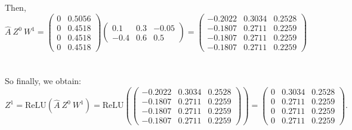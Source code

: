 \documentclass[a4paper]{article}
\begin{document}
Then,
\[
\hat{A}\ Z^0\ W^1 = \begin{pmatrix}
        0 & 0.5056 \\ 0 & 0.4518 \\ 0 & 0.4518 \\ 0 & 0.4518
    \end{pmatrix} \begin{pmatrix}
        0.1 & 0.3 & -0.05 \\ -0.4 & 0.6 & 0.5
    \end{pmatrix} = \begin{pmatrix}
-0.2022 & 0.3034 & 0.2528 \\ -0.1807 & 0.2711 & 0.2259 \\ -0.1807 & 0.2711 & 0.2259 \\ -0.1807 & 0.2711 & 0.2259
\end{pmatrix}
\]
\\\\
So finally, we obtain:
\[
Z^1 =  \text{ReLU}(\hat{A}\ Z^0\ W^1) = \text{ReLU}(\begin{pmatrix}
-0.2022 & 0.3034 & 0.2528 \\ -0.1807 & 0.2711 & 0.2259 \\ -0.1807 & 0.2711 & 0.2259 \\ -0.1807 & 0.2711 & 0.2259
\end{pmatrix}) = \begin{pmatrix}
0 & 0.3034 & 0.2528 \\ 0 & 0.2711 & 0.2259 \\ 0 & 0.2711 & 0.2259 \\ 0 & 0.2711 & 0.2259
\end{pmatrix}.
\]

% 
\end{document}
